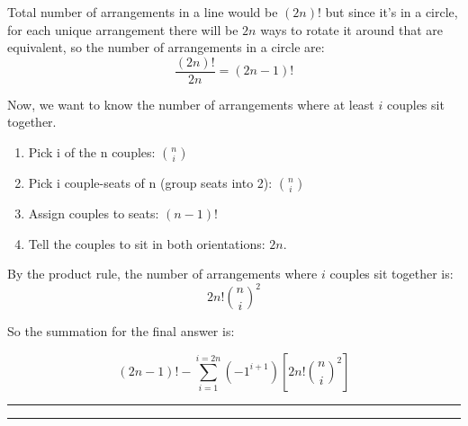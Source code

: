\documentclass[11pt,letterpaper]{article}
\newcommand{\question}[2] {\vspace{.25in} \hrule\vspace{0.5em}
\noindent{\bf #1: #2} \vspace{0.5em}
\hrule \vspace{.10in}}
\begin{document}
Total number of arrangements in a line would be $(2n)!$ but since it's in a circle, for each unique arrangement
there will be $2n$ ways to rotate it around that are equivalent, so the number of arrangements in a circle are:
$$\frac{(2n)!}{2n} = (2n-1)!$$

Now, we want to know the number of arrangements where at least $i$ couples sit together.
\begin{enumerate}
\item Pick i of the n couples: ${n \choose i}$
\item Pick i couple-seats of n (group seats into 2): ${n \choose i}$
\item Assign couples to seats: $ (n-1)! $
\item Tell the couples to sit in both orientations: $2n$.
\end{enumerate}
By the product rule, the number of arrangements where $i$ couples sit together is:
$$ 2n!{n \choose i}^2 $$

So the summation for the final answer is:

$$(2n-1)! - \sum_{i=1}^{i=2n} (-1^{i+1}) [2n!{n \choose i}^2]$$

\question{8}{8}
\end{document}
